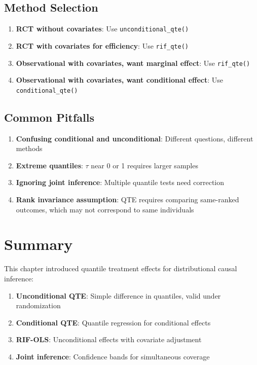 \subsection{Method Selection}

\begin{enumerate}
    \item \textbf{RCT without covariates}: Use \texttt{unconditional\_qte()}
    \item \textbf{RCT with covariates for efficiency}: Use \texttt{rif\_qte()}
    \item \textbf{Observational with covariates, want marginal effect}: Use \texttt{rif\_qte()}
    \item \textbf{Observational with covariates, want conditional effect}: Use \texttt{conditional\_qte()}
\end{enumerate}

\subsection{Common Pitfalls}

\begin{enumerate}
    \item \textbf{Confusing conditional and unconditional}: Different questions, different methods
    \item \textbf{Extreme quantiles}: $\tau$ near 0 or 1 requires larger samples
    \item \textbf{Ignoring joint inference}: Multiple quantile tests need correction
    \item \textbf{Rank invariance assumption}: QTE requires comparing same-ranked outcomes, which may not correspond to same individuals
\end{enumerate}

\section{Summary}
\label{sec:qte-summary}

This chapter introduced quantile treatment effects for distributional causal inference:

\begin{enumerate}
    \item \textbf{Unconditional QTE}: Simple difference in quantiles, valid under randomization
    \item \textbf{Conditional QTE}: Quantile regression for conditional effects
    \item \textbf{RIF-OLS}: Unconditional effects with covariate adjustment
    \item \textbf{Joint inference}: Confidence bands for simultaneous coverage
\end{enumerate}

